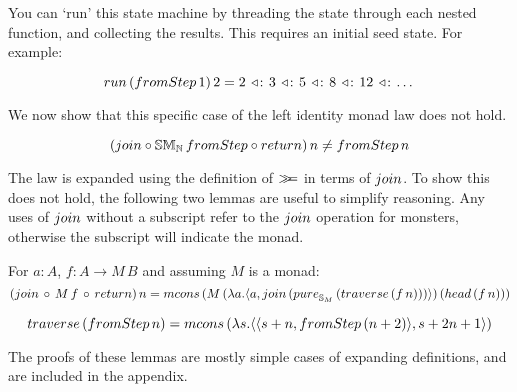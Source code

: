 You can `run' this state machine by threading the state through each nested function, and collecting the results. This requires an initial seed state. For example:

$$
\strun\,(\fromstepstr\, 1)\, 2 = 2\, \acons\, 3\, \acons\, 5\, \acons\, 8\, \acons\, 12\, \acons\, \dots
$$

We now show that this specific case of the left identity monad law does not hold. 

$$
(\join \comp \stmon{\nat}\, \fromstepstr \comp \return)\, n 
\neq \fromstepstr\, n
$$




The law is expanded using the definition of $\mathbin{\gg\!\!=}$ in terms of $\join$. 
To show this does not hold, the following two lemmas are useful to simplify reasoning. Any uses of $\join$ without a subscript refer to the $\join$ operation for monsters, otherwise the subscript will indicate the monad.

\begin{lemma}\label{lemma:general_bind_law}
For $a : A$, $f : A \rightarrow M\, B$ and assuming $M$ is a monad:
$$
(\join\, \comp\,  M\, f\, \comp\, \return)\, n = \mcons\, (M\,(\lambda a . \pair{a}{\join\, (\apure_{\stream{M}}\, (\traverse\, (f\, n)))})\, (\head\, (f\, n)))
$$
\end{lemma}
\begin{lemma}\label{lemma:traverse_fromstepstr}
$$
\traverse\, (\fromstepstr\, n) = \mcons\, (\lambda s . \pair{\pair{s+n}{\fromstepstr\, (n + 2)}}{s + 2n + 1})
$$
\end{lemma} 

The proofs of these lemmas are mostly simple cases of expanding definitions, and are included in the appendix.

